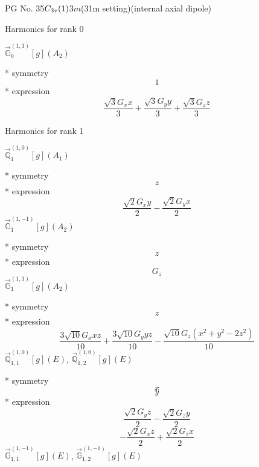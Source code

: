 \documentclass[fleqn,8pt]{jsarticle}
\begin{document}
\setcounter{MaxMatrixCols}{32}

\renewcommand{\tablename}{Table~}
\renewcommand{\figurename}{Figure~}
\begin{center}
\LARGE
PG No. 35\quad$C_{\rm 3v}(1)$\quad$3m$\quad(31m setting)\quad[ trigonal ] (internal axial dipole)
\end{center}

\noindent * Harmonics for rank 0

\noindent\quad $\vec{\mathbb{G}}_{0}^{(1,1)}[g](A_{2})$

\noindent\quad ** symmetry
\begin{dmath*}
1
\end{dmath*}
\noindent\quad ** expression
\begin{dmath*}
\frac{\sqrt{3} G_{x} x}{3} + \frac{\sqrt{3} G_{y} y}{3} + \frac{\sqrt{3} G_{z} z}{3}
\end{dmath*}

\noindent * Harmonics for rank 1

\noindent\quad $\vec{\mathbb{Q}}_{1}^{(1,0)}[g](A_{1})$

\noindent\quad ** symmetry
\begin{dmath*}
z
\end{dmath*}
\noindent\quad ** expression
\begin{dmath*}
\frac{\sqrt{2} G_{x} y}{2} - \frac{\sqrt{2} G_{y} x}{2}
\end{dmath*}
\noindent\quad $\vec{\mathbb{G}}_{1}^{(1,-1)}[g](A_{2})$

\noindent\quad ** symmetry
\begin{dmath*}
z
\end{dmath*}
\noindent\quad ** expression
\begin{dmath*}
G_{z}
\end{dmath*}
\noindent\quad $\vec{\mathbb{G}}_{1}^{(1,1)}[g](A_{2})$

\noindent\quad ** symmetry
\begin{dmath*}
z
\end{dmath*}
\noindent\quad ** expression
\begin{dmath*}
\frac{3 \sqrt{10} G_{x} x z}{10} + \frac{3 \sqrt{10} G_{y} y z}{10} - \frac{\sqrt{10} G_{z} \left(x^{2} + y^{2} - 2 z^{2}\right)}{10}
\end{dmath*}
\noindent\quad $\vec{\mathbb{Q}}_{1,1}^{(1,0)}[g](E)$, $\vec{\mathbb{Q}}_{1,2}^{(1,0)}[g](E)$

\noindent\quad ** symmetry
\begin{dmath*}
x
\end{dmath*}
\begin{dmath*}
y
\end{dmath*}
\noindent\quad ** expression
\begin{dmath*}
\frac{\sqrt{2} G_{y} z}{2} - \frac{\sqrt{2} G_{z} y}{2}
\end{dmath*}
\begin{dmath*}
- \frac{\sqrt{2} G_{x} z}{2} + \frac{\sqrt{2} G_{z} x}{2}
\end{dmath*}
\noindent\quad $\vec{\mathbb{G}}_{1,1}^{(1,-1)}[g](E)$, $\vec{\mathbb{G}}_{1,2}^{(1,-1)}[g](E)$
\end{document}

